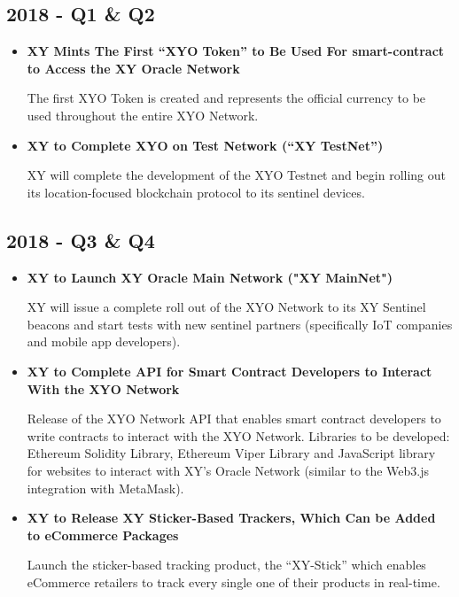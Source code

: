 \documentclass{article}
\begin{document}
\subsection{2018 - Q1 \& Q2 }
\begin{itemize}
\item \textbf{XY Mints The First ``XYO Token'' to Be Used For \Gls{smart-contract} to Access the XY Oracle Network}

The first XYO Token is created and represents the official currency to be used throughout the entire XYO Network.

\item \textbf{XY to Complete XYO on Test Network (``XY TestNet'')}

XY will complete the development of the XYO Testnet and begin rolling out its location-focused blockchain protocol to its \Gls{sentinel} devices.

\end{itemize}

\subsection{2018 - Q3 \& Q4}
\begin{itemize}
\item \textbf{XY to Launch XY Oracle Main Network ("XY MainNet")}

XY will issue a complete roll out of the XYO Network to its XY Sentinel beacons and start tests with new \Gls{sentinel} partners (specifically IoT companies and mobile app developers).

\item \textbf{XY to Complete API for Smart Contract Developers to Interact With the XYO Network}

Release of the XYO Network API that enables smart contract developers to write contracts to interact with the XYO Network. Libraries to be developed: Ethereum Solidity Library, Ethereum Viper Library and JavaScript library for websites to interact with XY's Oracle Network (similar to the Web3.js integration with MetaMask).

\item \textbf{XY to Release XY Sticker-Based Trackers, Which Can be Added to eCommerce Packages}

Launch the sticker-based tracking product, the ``XY-Stick'' which enables eCommerce retailers to track every single one of their products in real-time.

\end{itemize}
\end{document}
